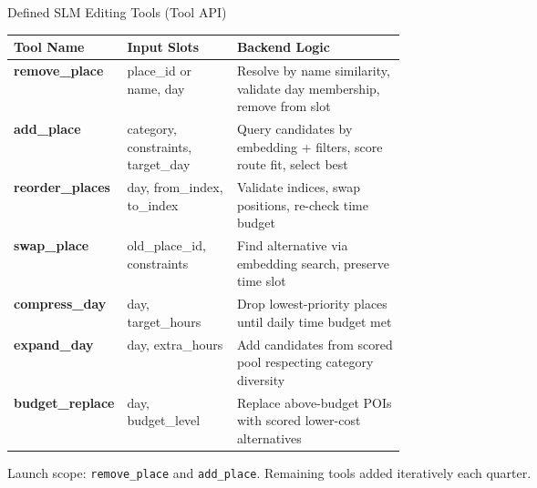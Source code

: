 \documentclass[aspectratio=169,professionalfonts]{beamer}
\begin{document}
\begin{frame}{Defined SLM Editing Tools (Tool API)}
  \begin{table}
    \footnotesize\centering
    \begin{tabularx}{\linewidth}{>{\bfseries\ttfamily}p{0.22\linewidth}
                                  >{\raggedright\arraybackslash}p{0.28\linewidth}
                                  >{\raggedright\arraybackslash}X}
      \toprule
      Tool Name & Input Slots & Backend Logic \\
      \midrule
      remove\_place
        & place\_id or name, day
        & Resolve by name similarity, validate day membership, remove from slot \\
      add\_place
        & category, constraints, target\_day
        & Query candidates by embedding + filters, score route fit, select best \\
      reorder\_places
        & day, from\_index, to\_index
        & Validate indices, swap positions, re-check time budget \\
      swap\_place
        & old\_place\_id, constraints
        & Find alternative via embedding search, preserve time slot \\
      compress\_day
        & day, target\_hours
        & Drop lowest-priority places until daily time budget met \\
      expand\_day
        & day, extra\_hours
        & Add candidates from scored pool respecting category diversity \\
      budget\_replace
        & day, budget\_level
        & Replace above-budget POIs with scored lower-cost alternatives \\
      \bottomrule
    \end{tabularx}
  \end{table}
  \vspace{0.05cm}
  \scriptsize Launch scope: \texttt{remove\_place} and \texttt{add\_place}.
  Remaining tools added iteratively each quarter.
\end{frame}
\end{document}
